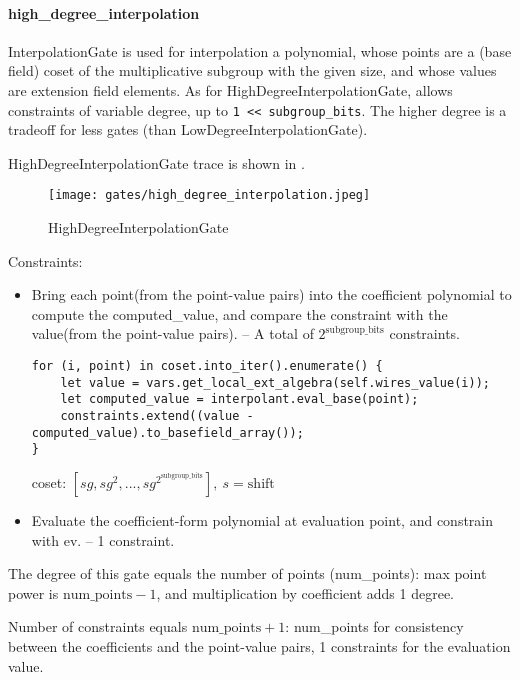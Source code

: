 \paragraph{high\_degree\_interpolation}

InterpolationGate is used for interpolation a polynomial, whose points are a (base field) coset of the multiplicative subgroup 
with the given size, and whose values are extension field elements. As for HighDegreeInterpolationGate,  allows constraints of variable degree, 
up to \verb|1 << subgroup_bits|. The higher degree is a tradeoff for less gates (than LowDegreeInterpolationGate).


HighDegreeInterpolationGate trace is shown in .

\begin{figure}[!ht]
    \centering
    \texttt{[image: gates/high\_degree\_interpolation.jpeg]}
    \caption{HighDegreeInterpolationGate}
    \label{fig:high-degree-interpolation}
\end{figure}


Constraints:
\begin{itemize}
    \item Bring each point(from the point-value pairs) into the coefficient polynomial to compute the computed\_value, 
    and compare the constraint with the value(from the point-value pairs). -- A total of $2^{\text{subgroup\_bits}}$ constraints.
    \begin{lstlisting}
for (i, point) in coset.into_iter().enumerate() {
    let value = vars.get_local_ext_algebra(self.wires_value(i));
    let computed_value = interpolant.eval_base(point);
    constraints.extend((value - computed_value).to_basefield_array());
}
    \end{lstlisting}
    coset: $[sg, sg^2,...,sg^{2^{\text{subgroup\_bits}}}], \ s=\text{shift}$
    \item Evaluate the coefficient-form polynomial at evaluation point, and constrain with ev. -- 1 constraint.
\end{itemize}

The degree of this gate equals the number of points (num\_points): max point power is $\text{num\_points} - 1$, and multiplication by coefficient adds 1 degree.

Number of constraints equals $\text{num\_points} + 1$: num\_points for consistency between the coefficients and the point-value pairs, 1 constraints for the evaluation value. 
